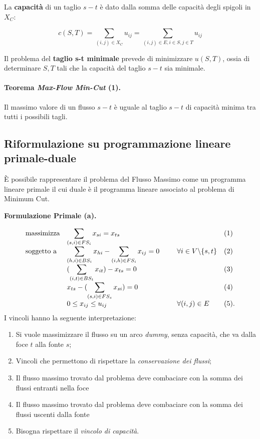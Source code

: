 \documentclass{article}
\begin{document}
La \textbf{capacità} di un taglio $s-t$ è dato dalla somma delle capacità degli spigoli in $X_C$:

\[c(S,T) = \sum_{(i, j) \in X_{C}} u_{ij} = \sum_{(i,j) \in E, i \in S, j \in T} u_{ij} \]

Il problema del \textbf{taglio s-t minimale} prevede di minimizzare $u(S,T)$, ossia di determinare $S, T$ tali che la capacità del taglio $s-t$ sia minimale.

\paragraph{Teorema \emph{Max-Flow Min-Cut} (1).} Il massimo valore di un flusso $s-t$ è uguale al taglio $s-t$ di capacità minima tra tutti i possibili tagli.\cite{Ford:1956:MFT}
\pagebreak

\subsection{Riformulazione su programmazione lineare primale-duale}  \label{lp-formulation}

È possibile rappresentare il problema del Flusso Massimo come un programma lineare primale il cui duale è il programma lineare associato al problema di Minimum Cut.

\textbf{Formulazione Primale (a).}

\begin{equation*}
    \begin{array}{ll@{}ll}
    \text{massimizza}   & \displaystyle\sum_{(s, i) \in FS_{i}} x_{si} = x_{ts} & \;\;\;\;\;\;\;\;\; &(1)\\
    \text{soggetto a}   & \displaystyle\sum_{(h, i) \in BS_{i}} x_{hi} - \sum_{(i, h) \in FS_{i}} x_{ij} = 0 \;\;\;\;\;\;\;\;\; &    \forall i \in V \backslash \{s,t\}&(2)\\
                        & (\displaystyle\sum_{(i, t) \in BS_{t}} x_{it}) - x_{ts} = 0 & &(3)\\
                        &  x_{ts} - (\displaystyle\sum_{(s,i) \in FS_{s}} x_{si}) = 0 & &(4)\\
                        &0 \leq x_{ij} \leq u_{ij} & \forall (i,j) \in E &(5).
    \end{array}
    \end{equation*}
I vincoli hanno la seguente interpretazione:
\begin{enumerate}
    \item Si vuole massimizzare il flusso su un arco \emph{dummy}, senza capacità, che va dalla foce $t$ alla fonte $s$;
    \item Vincoli che permettono di rispettare la \emph{conservazione dei flussi};
    \item Il flusso massimo trovato dal problema deve combaciare con la somma dei flussi entranti nella foce
    \item Il flusso massimo trovato dal problema deve combaciare con la somma dei flussi uscenti dalla fonte
    \item Bisogna rispettare il \emph{vincolo di capacità}.
\end{enumerate}
\end{document}
